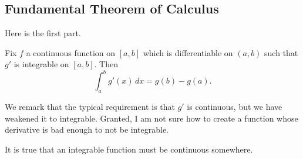 \subsection{Fundamental Theorem of Calculus}
Here is the first part.
\begin{theorem}
	Fix $f$ a continuous function on $[a,b]$ which is differentiable on $(a,b)$ such that $g'$ is integrable on $[a,b].$ Then
	\[\int_a^bg'(x)\,dx=g(b)-g(a).\]
\end{theorem}
We remark that the typical requirement is that $g'$ is continuous, but we have weakened it to integrable. Granted, I am not sure how to create a function whose derivative is bad enough to not be integrable.
\begin{remark}
	It is true that an integrable function must be continuous somewhere.
\end{remark}